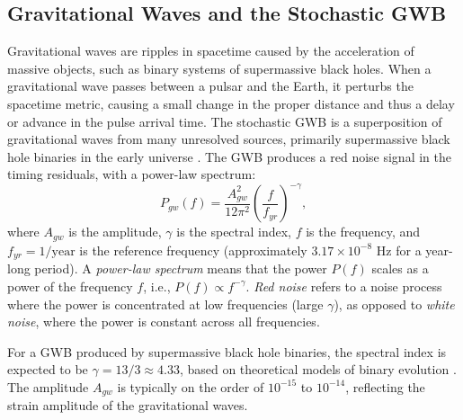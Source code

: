\documentclass[11pt]{article}
\begin{document}
\subsection{Gravitational Waves and the Stochastic GWB}
Gravitational waves are ripples in spacetime caused by the acceleration of massive objects, such as binary systems of supermassive black holes. When a gravitational wave passes between a pulsar and the Earth, it perturbs the spacetime metric, causing a small change in the proper distance and thus a delay or advance in the pulse arrival time. The stochastic GWB is a superposition of gravitational waves from many unresolved sources, primarily supermassive black hole binaries in the early universe \citep{phinney2001}. The GWB produces a red noise signal in the timing residuals, with a power-law spectrum:
\[
P_{gw}(f) = \frac{A_{gw}^2}{12 \pi^2} \left( \frac{f}{f_{yr}} \right)^{-\gamma},
\]
where $A_{gw}$ is the amplitude, $\gamma$ is the spectral index, $f$ is the frequency, and $f_{yr} = 1/\text{year}$ is the reference frequency (approximately $3.17 \times 10^{-8}$ Hz for a year-long period). A \textit{power-law spectrum} means that the power $P(f)$ scales as a power of the frequency $f$, i.e., $P(f) \propto f^{-\gamma}$. \textit{Red noise} refers to a noise process where the power is concentrated at low frequencies (large $\gamma$), as opposed to \textit{white noise}, where the power is constant across all frequencies.

For a GWB produced by supermassive black hole binaries, the spectral index is expected to be $\gamma = 13/3 \approx 4.33$, based on theoretical models of binary evolution \citep{phinney2001}. The amplitude $A_{gw}$ is typically on the order of $10^{-15}$ to $10^{-14}$, reflecting the strain amplitude of the gravitational waves.
\end{document}
